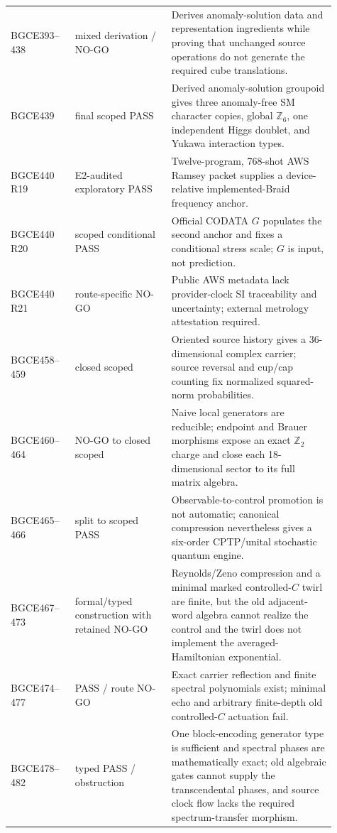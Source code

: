 \documentclass[11pt]{article}
\theoremstyle{definition}
\theoremstyle{remark}
\begin{document}
\begin{longtable}{>{\raggedright\arraybackslash}p{0.18\linewidth} >{\raggedright\arraybackslash}p{0.27\linewidth} >{\raggedright\arraybackslash}p{0.46\linewidth}}
BGCE393--438 & mixed derivation / NO-GO & Derives anomaly-solution data and representation ingredients while proving that unchanged source operations do not generate the required cube translations. \\
BGCE439 & final scoped PASS & Derived anomaly-solution groupoid gives three anomaly-free SM character copies, global $\mathbb Z_6$, one independent Higgs doublet, and Yukawa interaction types. \\
BGCE440 R19 & E2-audited exploratory PASS & Twelve-program, 768-shot AWS Ramsey packet supplies a device-relative implemented-Braid frequency anchor. \\
BGCE440 R20 & scoped conditional PASS & Official CODATA $G$ populates the second anchor and fixes a conditional stress scale; $G$ is input, not prediction. \\
BGCE440 R21 & route-specific NO-GO & Public AWS metadata lack provider-clock SI traceability and uncertainty; external metrology attestation required. \\
BGCE458--459 & closed scoped & Oriented source history gives a 36-dimensional complex carrier; source reversal and cup/cap counting fix normalized squared-norm probabilities. \\
BGCE460--464 & NO-GO to closed scoped & Naive local generators are reducible; endpoint and Brauer morphisms expose an exact $\mathbb Z_2$ charge and close each 18-dimensional sector to its full matrix algebra. \\
BGCE465--466 & split to scoped PASS & Observable-to-control promotion is not automatic; canonical compression nevertheless gives a six-order CPTP/unital stochastic quantum engine. \\
BGCE467--473 & formal/typed construction with retained NO-GO & Reynolds/Zeno compression and a minimal marked controlled-$C$ twirl are finite, but the old adjacent-word algebra cannot realize the control and the twirl does not implement the averaged-Hamiltonian exponential. \\
BGCE474--477 & PASS / route NO-GO & Exact carrier reflection and finite spectral polynomials exist; minimal echo and arbitrary finite-depth old controlled-$C$ actuation fail. \\
BGCE478--482 & typed PASS / obstruction & One block-encoding generator type is sufficient and spectral phases are mathematically exact; old algebraic gates cannot supply the transcendental phases, and source clock flow lacks the required spectrum-transfer morphism. \\

\end{longtable}
\end{document}
